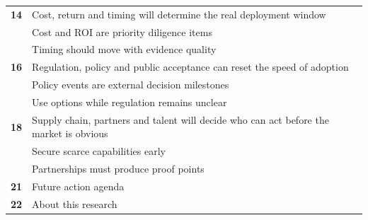 \documentclass[10pt,a4paper]{article}
\begin{document}
\begin{tabularx}{\linewidth}{p{14mm}Y}
\textcolor{BOGreen}{\bfseries 14} & Cost, return and timing will determine the real deployment window \\[5pt]
 & {\scriptsize\color{BOMuted} Cost and ROI are priority diligence items} \\[1pt]
 & {\scriptsize\color{BOMuted} Timing should move with evidence quality} \\[1pt]
\textcolor{BOGreen}{\bfseries 16} & Regulation, policy and public acceptance can reset the speed of adoption \\[5pt]
 & {\scriptsize\color{BOMuted} Policy events are external decision milestones} \\[1pt]
 & {\scriptsize\color{BOMuted} Use options while regulation remains unclear} \\[1pt]
\textcolor{BOGreen}{\bfseries 18} & Supply chain, partners and talent will decide who can act before the market is obvious \\[5pt]
 & {\scriptsize\color{BOMuted} Secure scarce capabilities early} \\[1pt]
 & {\scriptsize\color{BOMuted} Partnerships must produce proof points} \\[1pt]
\textcolor{BOGreen}{\bfseries 21} & Future action agenda \\[5pt]
\textcolor{BOGreen}{\bfseries 22} & About this research \\[5pt]
\end{tabularx}
\clearpage
\end{document}
